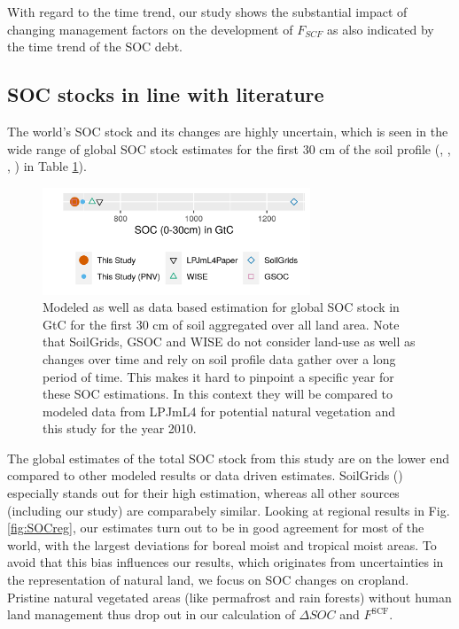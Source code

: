 \documentclass[gc, manuscript]{copernicus}
\begin{document}
With regard to the time trend, our study shows the substantial impact of changing management factors on the development of \(F_{SCF}\) as also indicated by the time trend of the SOC debt.

\hypertarget{soc-stocks-in-line-with-literature}{%
\subsection{SOC stocks in line with literature}\label{soc-stocks-in-line-with-literature}}

The world's SOC stock and its changes are highly uncertain, which is seen in the wide range of global SOC stock estimates for the first 30 cm of the soil profile (\citep{batjes_harmonized_2016}, \citep{hengl_soilgrids250m_2017}, \citep{fao_global_2018}, \citep{schaphoff_lpjml4_2018-1}) in Table \ref{fig:SOCglo}).

\begin{figure}[h]
\includegraphics[width=8cm]{../ResultNotebooks/Output/Images/glo_comparisonfigure} \caption{Modeled as well as data based estimation for global SOC stock in GtC for the first 30 cm of soil aggregated over all land area. Note that SoilGrids, GSOC and WISE do not consider land-use as well as changes over time and rely on soil profile data gather over a long period of time. This makes it hard to pinpoint a specific year for these SOC estimations. In this context they will be compared to modeled data from LPJmL4 for potential natural vegetation and this study for the year 2010.}\label{fig:SOCglo}
\end{figure}

The global estimates of the total SOC stock from this study are on the lower end compared to other modeled results or data driven estimates. SoilGrids (\citep{hengl_soilgrids250m_2017}) especially stands out for their high estimation, whereas all other sources (including our study) are comparabely similar. Looking at regional results in Fig. \ref{fig:SOCreg}, our estimates turn out to be in good agreement for most of the world, with the largest deviations for boreal moist and tropical moist areas. To avoid that this bias influences our results, which originates from uncertainties in the representation of natural land, we focus on SOC changes on cropland. Pristine natural vegetated areas (like permafrost and rain forests) without human land management thus drop out in our calculation of \(\Delta SOC\) and \(F^\mathrm{SCF}\).
\end{document}
